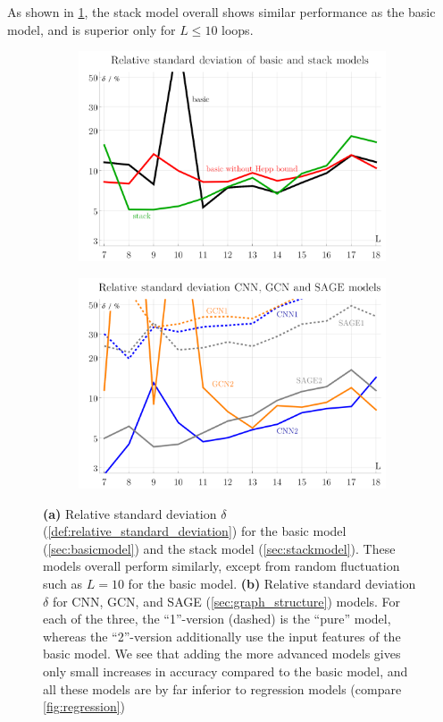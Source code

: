 \documentclass[12pt]{article}
\numberwithin{equation}{section}
\begin{document}
As shown in \cref{fig:basic_stack_delta}, the stack model overall shows similar performance as the basic model, and is superior only for $L \leq 10$ loops. 


\begin{figure}[htb]
	
	\begin{subfigure}{ .49 \linewidth}
		\centering
		\includegraphics[width=\linewidth]{figures/basic_stack_delta}
		\subcaption{}
		\label{fig:basic_stack_delta}
	\end{subfigure}
	\begin{subfigure}{ .49 \linewidth}
		\centering
		\includegraphics[width=\linewidth]{figures/GCN_CNN_delta}
		\subcaption{}
		\label{fig:GCN_CNN_delta}
	\end{subfigure}
	\caption{ 
		\textbf{(a)}  Relative standard deviation $\delta$ (\cref{def:relative_standard_deviation}) for the basic model (\cref{sec:basicmodel}) and the stack model (\cref{sec:stackmodel}). These models overall perform similarly, except from random fluctuation such as $L=10$ for the basic model.  
		\textbf{(b)} Relative standard deviation $\delta$ for CNN, GCN, and SAGE (\cref{sec:graph_structure}) models. For each of the three, the \enquote{1}-version (dashed) is the \enquote{pure} model, whereas the \enquote{2}-version additionally use the input features of the basic model. We see that adding the more advanced models gives only small increases in accuracy compared to the basic model, and all these models are by far inferior to regression models (compare  \cref{fig:regression}) 
		}
	

\end{figure}
\end{document}
